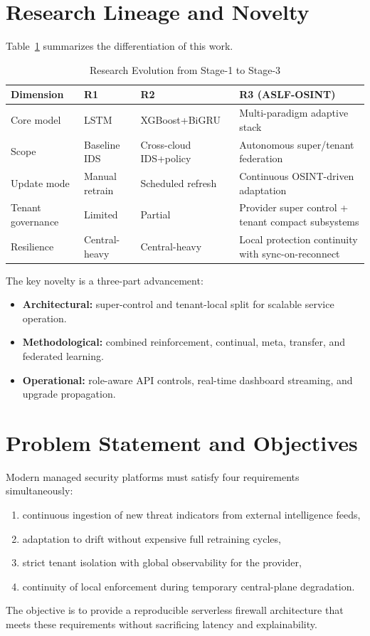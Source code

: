 \documentclass[conference]{IEEEtran}
\begin{document}
\section{Research Lineage and Novelty}
Table~\ref{tab:lineage} summarizes the differentiation of this work.

\begin{table}[t]
\centering
\caption{Research Evolution from Stage-1 to Stage-3}
\label{tab:lineage}
\begin{tabular}{p{1.7cm}p{1.7cm}p{1.7cm}p{2.8cm}}
\toprule
\textbf{Dimension} & \textbf{R1} & \textbf{R2} & \textbf{R3 (ASLF-OSINT)} \\
\midrule
Core model & LSTM & XGBoost+BiGRU & Multi-paradigm adaptive stack \\
Scope & Baseline IDS & Cross-cloud IDS+policy & Autonomous super/tenant federation \\
Update mode & Manual retrain & Scheduled refresh & Continuous OSINT-driven adaptation \\
Tenant governance & Limited & Partial & Provider super control + tenant compact subsystems \\
Resilience & Central-heavy & Central-heavy & Local protection continuity with sync-on-reconnect \\
\bottomrule
\end{tabular}
\end{table}

The key novelty is a three-part advancement:
\begin{itemize}
  \item \textbf{Architectural:} super-control and tenant-local split for scalable service operation.
  \item \textbf{Methodological:} combined reinforcement, continual, meta, transfer, and federated learning.
  \item \textbf{Operational:} role-aware API controls, real-time dashboard streaming, and upgrade propagation.
\end{itemize}

\section{Problem Statement and Objectives}
Modern managed security platforms must satisfy four requirements simultaneously:
\begin{enumerate}
  \item continuous ingestion of new threat indicators from external intelligence feeds,
  \item adaptation to drift without expensive full retraining cycles,
  \item strict tenant isolation with global observability for the provider,
  \item continuity of local enforcement during temporary central-plane degradation.
\end{enumerate}
The objective is to provide a reproducible serverless firewall architecture that meets these requirements without sacrificing latency and explainability.
\end{document}
